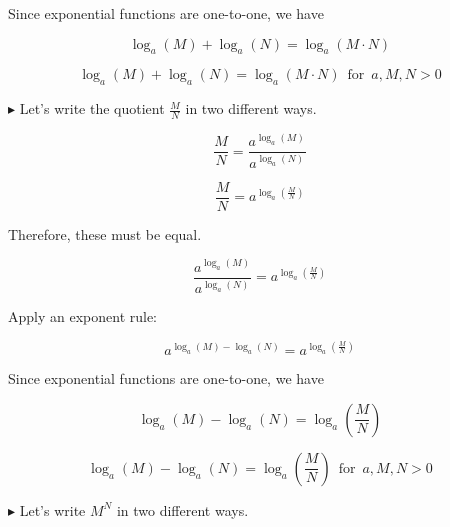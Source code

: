 \documentclass{ximera}
\begin{document}
Since exponential functions are one-to-one, we have 


\[    \log_a(M)+\log_a(N)    =   \log_a(M \cdot N)               \]




\begin{template} 

\[    \log_a(M)+\log_a(N)    =   \log_a(M \cdot N)      \, \text{ for } \, a, M, N > 0        \]


\end{template}




$\blacktriangleright$  Let's write the quotient $\frac{M}{N}$ in two different ways.



\[   \frac{M}{N} = \frac{a^{\log_a(M)}}{a^{\log_a(N)}}                    \]

\[   \frac{M}{N} = a^{\log_a\left(\frac{M}{N}\right)}                  \]


Therefore, these must be equal.


\[    \frac{a^{\log_a(M)}}{a^{\log_a(N)}}    =   a^{\log_a\left(\frac{M}{N}\right)}                \]


Apply an exponent rule:


\[    a^{\log_a(M) - \log_a(N)}    =   a^{\log_a\left(\frac{M}{N}\right)}                \]



Since exponential functions are one-to-one, we have 


\[    \log_a(M)-\log_a(N)    =   \log_a\left(\frac{M}{N}\right)             \]








\begin{template} 

\[    \log_a(M)-\log_a(N)    =   \log_a\left(\frac{M}{N}\right)        \, \text{ for } \, a, M, N > 0        \]


\end{template}




















$\blacktriangleright$  Let's write $M^N$ in two different ways.
\end{document}
